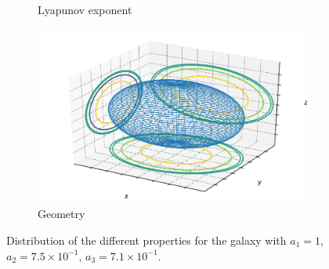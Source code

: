 \begin{figure}[h]
\begin{subfigure}[t]{0.4\textwidth}
        \caption{Lyapunov exponent}
    \end{subfigure}
    \begin{subfigure}[t]{0.4\textwidth}
        \includegraphics[width=\textwidth]{"../Files/Week 13/images/12_ellipsoid"}
        \caption{Geometry}
    \end{subfigure}
    \caption{Distribution of the different properties for the galaxy with $a_1 = 1$, $a_2 = 7.5\times10^{-1}$, $a_3 = 7.1\times10^{-1}$.}
    \label{fig: g18}
\end{figure}


